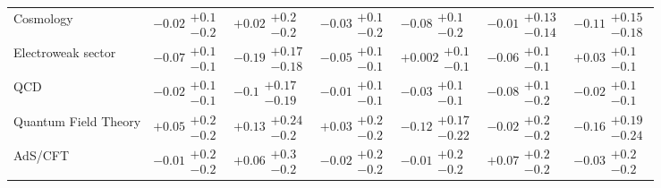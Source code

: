 \begin{table}[H]
\begin{tabular}{lllllll}
Cosmology                                 &           $-0.02\substack{+0.1 \\ -0.2}$ &           $+0.02\substack{+0.2 \\ -0.2}$ &           $-0.03\substack{+0.1 \\ -0.2}$ &           $-0.08\substack{+0.1 \\ -0.2}$ &         $-0.01\substack{+0.13 \\ -0.14}$ &         $-0.11\substack{+0.15 \\ -0.18}$ \\
Electroweak sector                        &           $-0.07\substack{+0.1 \\ -0.1}$ &    $\bm{-0.19}\substack{+0.17 \\ -0.18}$ &           $-0.05\substack{+0.1 \\ -0.1}$ &          $+0.002\substack{+0.1 \\ -0.1}$ &           $-0.06\substack{+0.1 \\ -0.1}$ &           $+0.03\substack{+0.1 \\ -0.1}$ \\
QCD                                       &           $-0.02\substack{+0.1 \\ -0.1}$ &          $-0.1\substack{+0.17 \\ -0.19}$ &           $-0.01\substack{+0.1 \\ -0.1}$ &           $-0.03\substack{+0.1 \\ -0.1}$ &           $-0.08\substack{+0.1 \\ -0.2}$ &           $-0.02\substack{+0.1 \\ -0.1}$ \\
Quantum Field Theory                      &           $+0.05\substack{+0.2 \\ -0.2}$ &          $+0.13\substack{+0.24 \\ -0.2}$ &           $+0.03\substack{+0.2 \\ -0.2}$ &         $-0.12\substack{+0.17 \\ -0.22}$ &           $-0.02\substack{+0.2 \\ -0.2}$ &         $-0.16\substack{+0.19 \\ -0.24}$ \\
AdS/CFT                                   &           $-0.01\substack{+0.2 \\ -0.2}$ &           $+0.06\substack{+0.3 \\ -0.2}$ &           $-0.02\substack{+0.2 \\ -0.2}$ &           $-0.01\substack{+0.2 \\ -0.2}$ &           $+0.07\substack{+0.2 \\ -0.2}$ &           $-0.03\substack{+0.2 \\ -0.2}$ \\
\bottomrule
\end{tabular}\normalsize\renewcommand{\arraystretch}{1}
\end{table}
